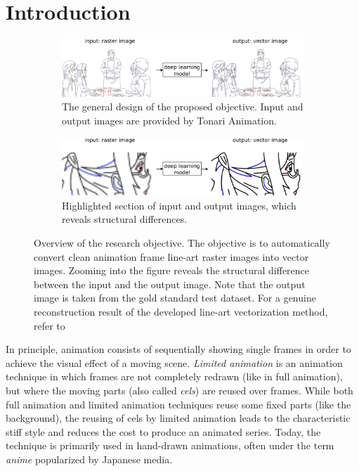 \chapter{Introduction} \label{ch:intro}

\begin{figure}[h]
    \centering
    \begin{subfigure}{\textwidth}
    \includegraphics[width=\textwidth]{graphics/work_overview.pdf}
    \caption{The general design of the proposed objective. Input and output images are provided by Tonari Animation.}
    \end{subfigure}
    \begin{subfigure}{\textwidth}
    \includegraphics[width=\textwidth]{graphics/work_overview_zoom_8x.pdf}
    \caption{Highlighted section of input and output images, which reveals structural differences.}
    \end{subfigure}
    \caption{Overview of the research objective. The objective is to automatically convert clean animation frame line-art raster images into vector images. Zooming into the figure reveals the structural difference between the input and the output image. Note that the output image is taken from the gold standard test dataset. For a genuine reconstruction result of the developed line-art vectorization method, refer to }
    \label{fig:work-overview}
\end{figure}

In principle, animation consists of sequentially showing single frames in order to achieve the visual effect of a moving scene. \emph{Limited animation} is an animation technique in which frames are not completely redrawn (like in full animation), but where the moving parts (also called \emph{cels}) are reused over frames. While both full animation and limited animation techniques reuse some fixed parts (like the background), the reusing of cels by limited animation leads to the characteristic stiff style and reduces the cost to produce an animated series. Today, the technique is primarily used in hand-drawn animations, often under the term \emph{anime} popularized by Japanese media.

